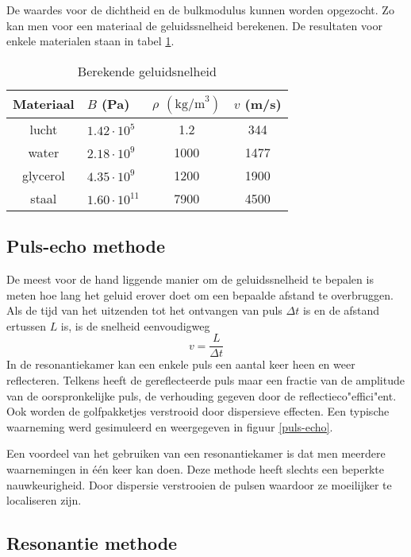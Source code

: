 De waardes voor de dichtheid en de bulkmodulus kunnen worden opgezocht. Zo kan 
men voor een materiaal de geluidssnelheid berekenen. De resultaten voor enkele 
materialen staan in tabel \ref{speedtable}. 

\begin{table}[htb]
\caption{Berekende geluidsnelheid}
\label{speedtable}
\begin{center}
\begin{tabular}{c||lcc}
Materiaal & $B$ (Pa) & $\rho$ $(\textrm{kg/m}^3)$ & $v$ (m/s) \\\hline
lucht	& $1.42 \cdot 10^5$	& 1.2  & 344 \\
water	& $2.18 \cdot 10^9$	& 1000 & 1477 \\
glycerol& $4.35 \cdot 10^9$	& 1200 & 1900 \\
staal	& $1.60 \cdot 10^{11}$	& 7900 & 4500 \\
\end{tabular}
\end{center}
\end{table}

\subsection{Puls-echo methode}
De meest voor de hand liggende manier om de geluidssnelheid te bepalen is meten 
hoe lang het geluid erover doet om een bepaalde afstand te overbruggen. Als de 
tijd van het uitzenden tot het ontvangen van puls $\Delta t$ is en de afstand 
ertussen $L$ is, is de snelheid eenvoudigweg
$$
v = \frac{L}{\Delta t}
$$
In de resonantiekamer kan een enkele puls een aantal keer heen en weer 
reflecteren. Telkens heeft de gereflecteerde puls maar een fractie van de 
amplitude van de oorspronkelijke puls, de verhouding gegeven door de 
reflectieco"effici"ent.  Ook worden de golfpakketjes verstrooid door 
dispersieve effecten. Een typische waarneming werd gesimuleerd en weergegeven 
in figuur \ref{puls-echo}. 


Een voordeel van het gebruiken van een resonantiekamer is dat
men meerdere waarnemingen in \'e\'en keer kan doen.
Deze methode heeft slechts een beperkte nauwkeurigheid. Door dispersie 
verstrooien de pulsen waardoor ze moeilijker te localiseren zijn.

\subsection{Resonantie methode}

